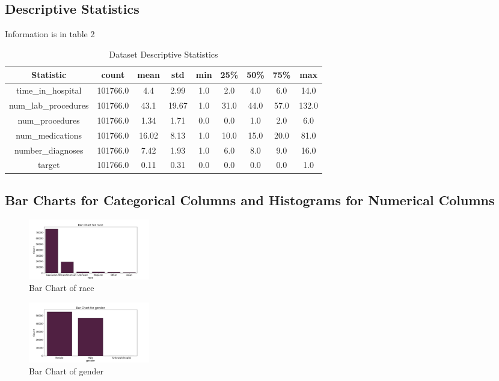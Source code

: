 \documentclass{article}%
\begin{document}
%
\newpage%
\subsection{Descriptive Statistics}%
\label{subsec:DescriptiveStatistics}%
Information is in table 2%


\begin{table}[h!]%
\caption{Dataset Descriptive Statistics}%
\vspace{0.2cm}%
\centering%
\begin{tabular}{|c|c|c|c|c|c|c|c|c|}%
\hline%
Statistic&count&mean&std&min&25\%&50\%&75\%&max\\%
\hline%
time\_in\_hospital&101766.0&4.4&2.99&1.0&2.0&4.0&6.0&14.0\\%
num\_lab\_procedures&101766.0&43.1&19.67&1.0&31.0&44.0&57.0&132.0\\%
num\_procedures&101766.0&1.34&1.71&0.0&0.0&1.0&2.0&6.0\\%
num\_medications&101766.0&16.02&8.13&1.0&10.0&15.0&20.0&81.0\\%
number\_diagnoses&101766.0&7.42&1.93&1.0&6.0&8.0&9.0&16.0\\%
target&101766.0&0.11&0.31&0.0&0.0&0.0&0.0&1.0\\%
\hline%
\end{tabular}%
\end{table}

%
\newpage%
\subsection{Bar Charts for Categorical Columns and Histograms for Numerical Columns}%
\label{subsec:BarChartsforCategoricalColumnsandHistogramsforNumericalColumns}%


\begin{figure}[h!]%
\centering%
\includegraphics[width=200px]{eda/bar_charts/race_bar_chart.png}%
\caption{Bar Chart of race}%
\end{figure}

%


\begin{figure}[h!]%
\centering%
\includegraphics[width=200px]{eda/bar_charts/gender_bar_chart.png}%
\caption{Bar Chart of gender}%
\end{figure}
\end{document}
